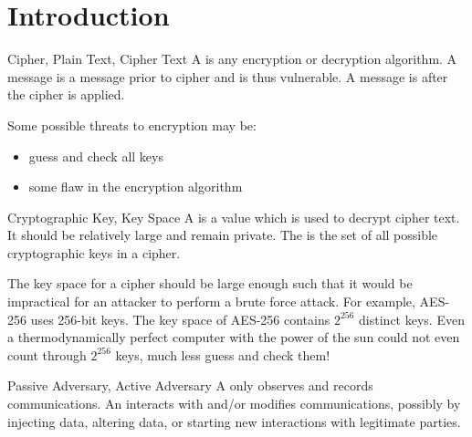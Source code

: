 \documentclass[code]{amznotes}
\begin{document}
\section{Introduction}

\begin{dfnbox}{Cipher, Plain Text, Cipher Text}{}
    A  is any encryption or decryption algorithm. A  message is a message prior to cipher and is thus vulnerable. A  message is after the cipher is applied.
\end{dfnbox}

Some possible threats to encryption may be:
\begin{itemize}[noitemsep]
    \item {} guess and check all keys
    \item {} some flaw in the encryption algorithm
\end{itemize}

\begin{dfnbox}{Cryptographic Key, Key Space}{}
    A  is a value which is used to decrypt cipher text. It should be relatively large and remain private. The  is the set of all possible cryptographic keys in a cipher.
\end{dfnbox}

The key space for a cipher should be large enough such that it would be impractical for an attacker to perform a brute force attack. For example, AES-256 uses 256-bit keys. The key space of AES-256 contains $2^{256}$ distinct keys. Even a thermodynamically perfect computer with the power of the sun could not even count through $2^{256}$ keys, much less guess and check them!

\begin{dfnbox}{Passive Adversary, Active Adversary}{}
    A  only observes and records communications. An  interacts with and/or modifies communications, possibly by injecting data, altering data, or starting new interactions with legitimate parties.
\end{dfnbox}

\end{document}

